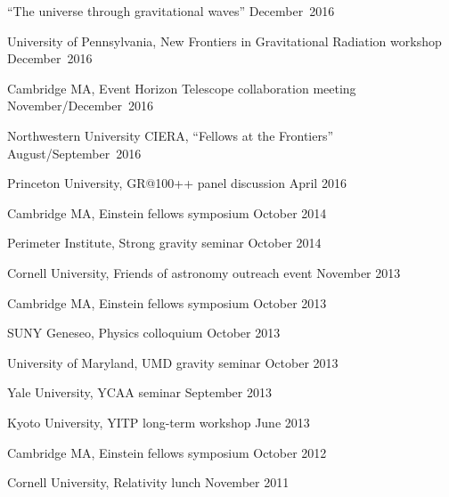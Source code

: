 \begin{etaremune}
  ``The universe through gravitational waves''
  \hfill{}
  December~2016
\item
  University of Pennsylvania,
  New Frontiers in Gravitational Radiation workshop
  \hfill{}
  December~2016
\item
  Cambridge MA,
  Event Horizon Telescope collaboration meeting
  \hfill{}
  November/December~2016
\item
  Northwestern University CIERA,
  ``Fellows at the Frontiers''
  \hfill{}
  August/September~2016
\item
  Princeton University,
  GR@100++ panel discussion
  \hfill{}
  April 2016
\item
  Cambridge MA,
  Einstein fellows symposium
  \hfill{}
  October 2014
\item
  Perimeter Institute,
  Strong gravity seminar
  \hfill{}
  October 2014
\item
  Cornell University,
  Friends of astronomy outreach event
  \hfill{}
  November 2013
\item
  Cambridge MA,
  Einstein fellows symposium
  \hfill{}
  October 2013
\item
  SUNY Geneseo,
  Physics colloquium
  \hfill{}
  October 2013
\item
  University of Maryland,
  UMD gravity seminar
  \hfill{}
  October 2013
\item
  Yale University,
  YCAA seminar
  \hfill{}
  September 2013
\item
  Kyoto University,
  YITP long-term workshop
  \hfill{}
  June 2013
\item
  Cambridge MA,
  Einstein fellows symposium
  \hfill{}
  October 2012
\item
  Cornell University,
  Relativity lunch
  \hfill{}
  November 2011
\end{etaremune}

